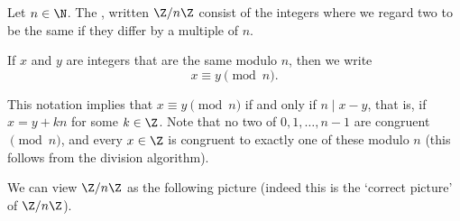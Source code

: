 \begin{definition}
	Let $n \in \N$. The , written $\Z/n\Z$ consist of the integers where we regard two to be the same if they differ by a multiple of $n$.
\end{definition}

\begin{definition}
	If $x$ and $y$ are integers that are the same modulo $n$, then we write
	$$
	x \equiv y \pmod{n}.
	$$
\end{definition}

This notation implies that $x \equiv y \pmod{n}$ if and only if $n \mid x - y$, that is, if $x = y + kn$ for some $k \in \Z$.
Note that no two of $0, 1, \dots, n - 1$ are congruent $\pmod{n}$, and every $x \in \Z$ is congruent to exactly one of these modulo $n$ (this follows from the division algorithm).

We can view $\Z/n\Z$ as the following picture (indeed this is the `correct picture' of $\Z/n\Z$).

